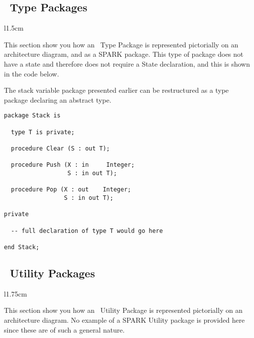 \subsection{\informed\ Type Packages}

\begin{wrapfigure}{l}{1.5cm}
\end{wrapfigure}

This section show you how an \informed\ Type Package is represented
pictorially on an architecture diagram, and as a SPARK package. This
type of package does not have a state and therefore does not require a
State declaration, and this is shown in the code below.

The stack variable package presented earlier can be restructured as a
type package declaring an abstract type.

\begin{lstlisting}[caption=An \informed\ SPARK Type Package]
package Stack is

  type T is private;

  procedure Clear (S : out T);

  procedure Push (X : in     Integer;
                  S : in out T);

  procedure Pop (X : out    Integer;
                 S : in out T);

private

  -- full declaration of type T would go here

end Stack;
\end{lstlisting}


\subsection{\informed\ Utility Packages}

\begin{wrapfigure}{l}{1.75cm}
\end{wrapfigure}

This section show you how an \informed\ Utility Package is represented
pictorially on an architecture diagram. No example of a SPARK Utility
package is provided here since these are of such a general nature.

